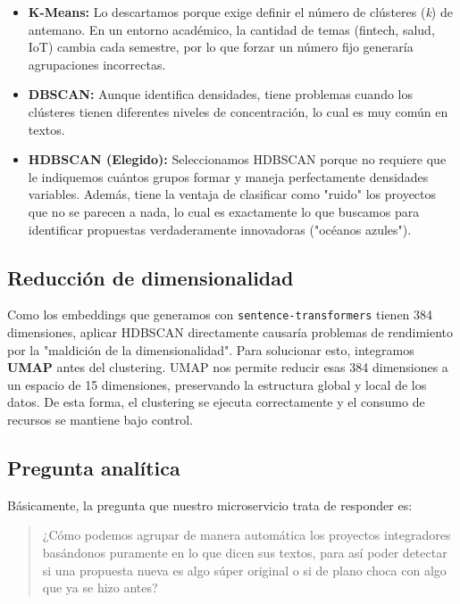 \begin{itemize}
  \item \textbf{K-Means:} Lo descartamos porque exige definir el número de clústeres (\textit{k}) de antemano. En un entorno académico, la cantidad de temas (fintech, salud, IoT) cambia cada semestre, por lo que forzar un número fijo generaría agrupaciones incorrectas.
  \item \textbf{DBSCAN:} Aunque identifica densidades, tiene problemas cuando los clústeres tienen diferentes niveles de concentración, lo cual es muy común en textos.
  \item \textbf{HDBSCAN (Elegido):} Seleccionamos HDBSCAN porque no requiere que le indiquemos cuántos grupos formar y maneja perfectamente densidades variables. Además, tiene la ventaja de clasificar como "ruido" los proyectos que no se parecen a nada, lo cual es exactamente lo que buscamos para identificar propuestas verdaderamente innovadoras ("océanos azules").
\end{itemize}

\subsection{Reducción de dimensionalidad}

Como los embeddings que generamos con \texttt{sentence-transformers} tienen 384 dimensiones, aplicar HDBSCAN directamente causaría problemas de rendimiento por la "maldición de la dimensionalidad". Para solucionar esto, integramos \textbf{UMAP} antes del clustering. UMAP nos permite reducir esas 384 dimensiones a un espacio de 15 dimensiones, preservando la estructura global y local de los datos. De esta forma, el clustering se ejecuta correctamente y el consumo de recursos se mantiene bajo control.

\subsection{Pregunta analítica}

Básicamente, la pregunta que nuestro microservicio trata de responder es:

\begin{quote}
  ¿Cómo podemos agrupar de manera automática los proyectos integradores basándonos puramente en lo que dicen sus textos, para así poder detectar si una propuesta nueva es algo súper original o si de plano choca con algo que ya se hizo antes?
\end{quote}

